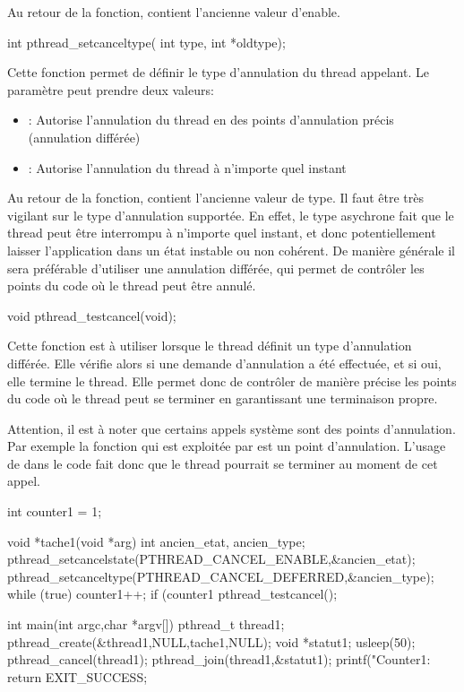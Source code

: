Au retour de la fonction,  contient l'ancienne valeur d'enable.


\label{func:pthread_setcanceltype}

\begin{codeblock}
int pthread_setcanceltype(
  int type,
  int *oldtype);
\end{codeblock}
Cette fonction permet de définir le type d'annulation du thread appelant. Le paramètre  peut prendre deux valeurs:
\begin{itemize}
  \item {}: Autorise l'annulation du thread en des points d'annulation précis (annulation différée)
  \item {}: Autorise l'annulation du thread à n'importe quel instant
\end{itemize}

Au retour de la fonction,  contient l'ancienne valeur de type. Il faut \^etre très vigilant sur le type d'annulation supportée. En effet, le type asychrone fait que le thread peut \^etre interrompu à n'importe quel instant, et donc potentiellement laisser l'application dans un état instable ou non cohérent. De manière générale il sera préférable d'utiliser une annulation différée, qui permet de contrôler les points du code où le thread peut être annulé.


\label{func:pthread_testcancel}

\begin{codeblock}
void pthread_testcancel(void);
\end{codeblock}

Cette fonction est à utiliser lorsque le thread définit un type d'annulation différée. Elle vérifie alors si une demande d'annulation a été effectuée, et si oui, elle termine le thread. Elle permet donc de contr\^oler de manière précise les points du code o\`u le thread peut se terminer en garantissant une terminaison propre.

Attention, il est à noter que certains appels système sont des points d'annulation. Par exemple la fonction  qui est exploitée par  est un point d'annulation. L'usage de  dans le code fait donc que le thread pourrait se terminer au moment de cet appel.



\begin{codeblock}
int counter1 = 1;

void *tache1(void *arg) {
    int ancien_etat, ancien_type;
    pthread_setcancelstate(PTHREAD_CANCEL_ENABLE,&ancien_etat);
    pthread_setcanceltype(PTHREAD_CANCEL_DEFERRED,&ancien_type);
    while (true) {
        counter1++;
        if (counter1 %
            pthread_testcancel();
    }
}

int main(int argc,char *argv[]) {
    pthread_t thread1;
    pthread_create(&thread1,NULL,tache1,NULL);
    void *statut1;
    usleep(50);
    pthread_cancel(thread1);
    pthread_join(thread1,&statut1);
    printf("Counter1: %
    return EXIT_SUCCESS;
}
\end{codeblock}

